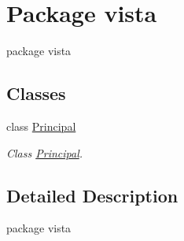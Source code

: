 \hypertarget{namespacevista}{}\section{Package vista}
\label{namespacevista}


package vista  


\subsection*{Classes}
\begin{DoxyCompactItemize}
\item 
class \mbox{\hyperlink{classvista_1_1_principal}{Principal}}
\begin{DoxyCompactList}\small\item\em Class \mbox{\hyperlink{classvista_1_1_principal}{Principal}}. \end{DoxyCompactList}\end{DoxyCompactItemize}


\subsection{Detailed Description}
package vista 